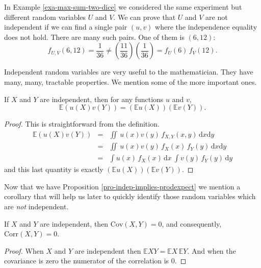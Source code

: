 In Example \ref{exa-max-sum-two-dice} we considered the same experiment but
different random variables \(U\) and \(V\). We can prove that \(U\)
and \(V\) are not independent if we can find a single pair \((u,v)\)
where the independence equality does not hold. There are many such
pairs. One of them is \((6,12)\): \[
f_{U,V}(6,12)=\frac{1}{36}\neq\left(\frac{11}{36}\right)\left(\frac{1}{36}\right)=f_{U}(6)\,
f_{V}(12).  \]


Independent random variables are very useful to the
mathematician. They have many, many, tractable properties. We mention
some of the more important ones.

\begin{prop}
\label{pro-indep-implies-prodexpect} If \(X\) and \(Y\) are independent,
then for any functions \(u\) and \(v\),
\begin{equation}
\mathbb{E}\left(u(X)v(Y)\right)=\left(\mathbb{E} u(X)\right)\left(\mathbb{E} v(Y)\right).
\end{equation}
\end{prop}

\begin{proof}
This is straightforward from the definition.
\begin{eqnarray*}
\mathbb{E}\left(u(X)v(Y)\right) & = & \iint\, u(x)v(y)\, f_{X,Y}(x,y)\,\mathrm{d} x\mathrm{d} y\\
 & = & \iint\, u(x)v(y)\, f_{X}(x)\, f_{Y}(y)\,\mathrm{d} x\mathrm{d} y\\
 & = & \int u(x)\, f_{X}(x)\,\mathrm{d} x\ \int v(y)\, f_{Y}(y)\,\mathrm{d} y
\end{eqnarray*}
and this last quantity is exactly \(\left(\mathbb{E} u(X)\right)\left(\mathbb{E} v(Y)\right)\). 
\end{proof}

Now that we have Proposition \ref{pro-indep-implies-prodexpect} we mention a
corollary that will help us later to quickly identify those random
variables which are \emph{not} independent.

\begin{cor}
\label{cor-indep-implies-uncorr} If \(X\) and \(Y\) are independent, then
\(\mbox{Cov}(X,Y)=0\), and consequently, \(\mbox{Corr}(X,Y)=0\).
\end{cor}

\begin{proof}
When \(X\) and \(Y\) are independent then \(\mathbb{E} XY=\mathbb{E}
X\,\mathbb{E} Y\). And when the covariance is zero the numerator of
the correlation is 0.
\end{proof}

